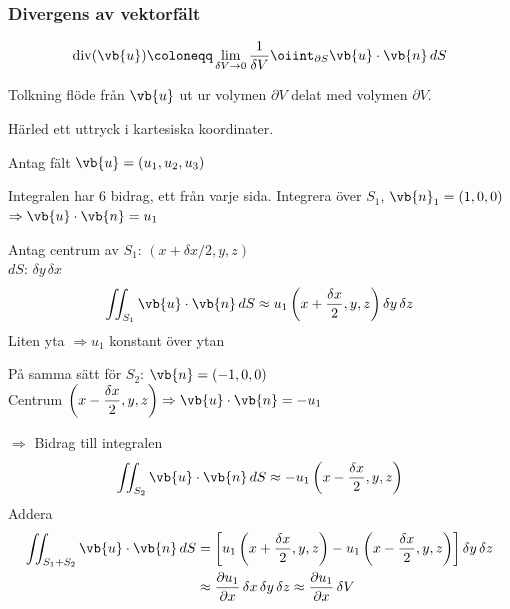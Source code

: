 \subsubsection*{Divergens av vektorfält}
\[ \operatorname{div}(\vb{u}) \coloneqq \lim_{\delta V \to 0} \frac{1}{\delta V} \oiint_{\partial S} \vb{u} \cdot \vb{n}\,dS \]

\begin{minipage}{0.42\linewidth}
\end{minipage}
\begin{minipage}{0.56\linewidth}
Tolkning flöde från $\vb{u}$ ut ur volymen $\partial V$ delat med volymen $\partial V$.

Härled ett uttryck i kartesiska koordinater.
\end{minipage}

Antag fält $\vb{u} = (u_1, u_2, u_3)$

\begin{minipage}{0.42\linewidth}
\end{minipage}
\begin{minipage}{0.56\linewidth}
Integralen har 6 bidrag, ett från varje sida. Integrera över $S_1$, $\vb{n}_1 = (1, 0, 0)$\\
$\Rightarrow \vb{u} \cdot \vb{n} = u_1$
\end{minipage}

Antag centrum av $S_1$: $(x + \delta x/2, y, z)$\\
\phantom{Antag centrum av} $dS$: $\delta y\,\delta x$
\[ \iint_{S_1} \vb{u} \cdot \vb{n}\,dS \approx u_1\left( x + \frac{\delta x}{2}, y, z \right) \delta y\,\delta z \]
\hfill Liten yta $\Rightarrow u_1$ konstant över ytan \hfill\null

På samma sätt för $S_2$: $\vb{n} = (-1, 0, 0)$\\
Centrum $\left( x - \dfrac{\delta x}{2}, y, z \right) \Rightarrow \vb{u} \cdot \vb{n} = -u_1$

$\Rightarrow$ Bidrag till integralen
\[ \iint_{S_2} \vb{u} \cdot \vb{n}\,dS \approx -u_1\left( x - \frac{\delta x}{2}, y, z \right) \]
Addera
\begin{align*}
\iint_{S_1 + S_2} \vb{u} \cdot \vb{n}\,dS &= \left[ u_1\left( x + \frac{\delta x}{2}, y, z \right) - u_1\left( x - \frac{\delta x}{2}, y, z \right) \right] \delta y\,\delta z \\
&\approx \frac{\partial u_1}{\partial x}\,\delta x\,\delta y\,\delta z \approx \frac{\partial u_1}{\partial x}\,\delta V
\end{align*}
